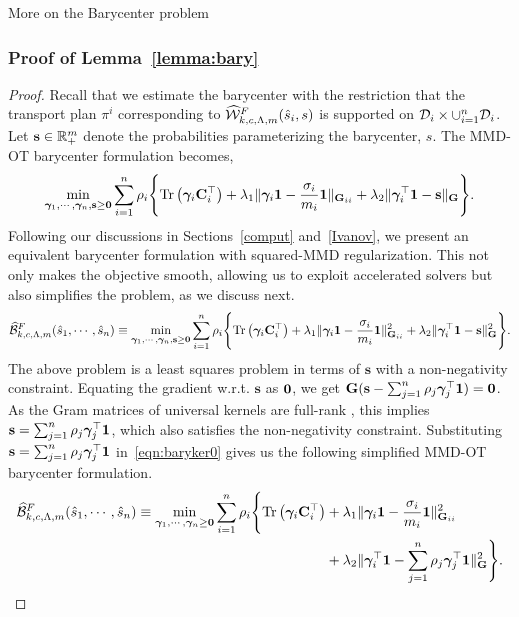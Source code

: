 \begin{subsection}{More on the Barycenter problem}\label{supp:bary}
\subsubsection[Simplification of the proposed barycenter formulation]{Proof of Lemma~\ref{lemma:bary}}\label{proof:lemma-bary} 
\barycons*
\begin{proof}
Recall that we estimate the barycenter with the restriction that the transport plan $\pi^i$ corresponding to $\widehat{\mathcal{W}}^F_{k, c, \Lambda, m}(\hat{s}_i, s)$ is supported on $\mathcal{D}_i\times \cup_{i=1}^n \mathcal{D}_i$. Let $\mathbf{s}\in \mathbb{R}_+^m$ denote the probabilities parameterizing the barycenter, $s$. The MMD-OT barycenter formulation becomes,
\begin{align}\label{eqn:baryker00}
    \min\limits_{\bm{\gamma}_1, \cdots, \bm{\gamma}_n, \mathbf{s}\ge\mathbf{0} }\sum_{i=1}^n\rho_i\Bigg\{\textup{Tr}\left(\bm{\gamma}_i\mathbf{C}_i^\top\right)+\lambda_1\|\bm{\gamma}_i\mathbf{1}-\frac{\sigma_i}{m_i}\mathbf{1}\|_{\mathbf{G}_{ii}}+
    \lambda_2 \| \bm{\gamma}_i^\top\mathbf{1}-\mathbf{s} \|_{\mathbf{G}}\Bigg\}.
\end{align}
Following our discussions in Sections~\ref{comput} and~\ref{Ivanov}, we present an equivalent barycenter formulation with squared-MMD regularization. This not only makes the objective smooth, allowing us to exploit accelerated solvers but also simplifies the problem, as we discuss next.
\begin{align}\label{eqn:baryker0}
    \widehat{\mathcal{B}}^F_{k,c,\Lambda, m}(\hat{s}_1, \cdots,\hat{s}_n)\equiv\min\limits_{\bm{\gamma}_1, \cdots, \bm{\gamma}_n, \mathbf{s}\ge\mathbf{0}}\sum_{i=1}^n\rho_i\Bigg\{\textup{Tr}\left(\bm{\gamma}_i\mathbf{C}_i^\top\right)+\lambda_1\|\bm{\gamma}_i\mathbf{1}-\frac{\sigma_i}{m_i}\mathbf{1}\|^2_{\mathbf{G}_{ii}}+
    \lambda_2 \| \bm{\gamma}_i^\top\mathbf{1}-\mathbf{s} \|^2_{\mathbf{G}}\Bigg\}.
\end{align}
The above problem is a least squares problem in terms of $\mathbf{s}$ with a non-negativity constraint. Equating the gradient w.r.t. $\mathbf{s}$ as $\mathbf{0}$, we get $\mathbf{G}(\mathbf{s}-\sum_{j=1}^n\rho_j\bm{\gamma}_j^\top \mathbf{1})=\mathbf{0}$.
As the Gram matrices of universal kernels are full-rank \cite[Corollary~32]{Song08}, this implies $\mathbf{s}=\sum_{j=1}^n\rho_j\bm{\gamma}_j^\top \mathbf{1}$, which also satisfies the non-negativity constraint. Substituting $\mathbf{s}=\sum_{j=1}^n\rho_j\bm{\gamma}_j^\top \mathbf{1}$ in~\ref{eqn:baryker0} gives us the following simplified MMD-OT barycenter formulation.
\begin{align}\label{bary-simplified}
    \widehat{\mathcal{B}}^F_{k,c,\Lambda, m}(\hat{s}_1, \cdots,\hat{s}_n) \equiv \min\limits_{\bm{\gamma}_1, \cdots, \bm{\gamma}_n\ge\mathbf{0}}\sum_{i=1}^n\rho_i\Bigg\{\textup{Tr}\left(\bm{\gamma}_i\mathbf{C}_i^\top\right)&+\lambda_1\|\bm{\gamma}_i\mathbf{1}-\frac{\sigma_i}{m_i}\mathbf{1}\|^2_{\mathbf{G}_{ii}}\nonumber \\
    &
    +\lambda_2 \| \bm{\gamma}_i^\top\mathbf{1}-\sum_{j=1}^n\rho_j\bm{\gamma}_j^\top \mathbf{1} \|^2_{\mathbf{G}}\Bigg\}.
\end{align}
\end{proof}

\end{subsection}
